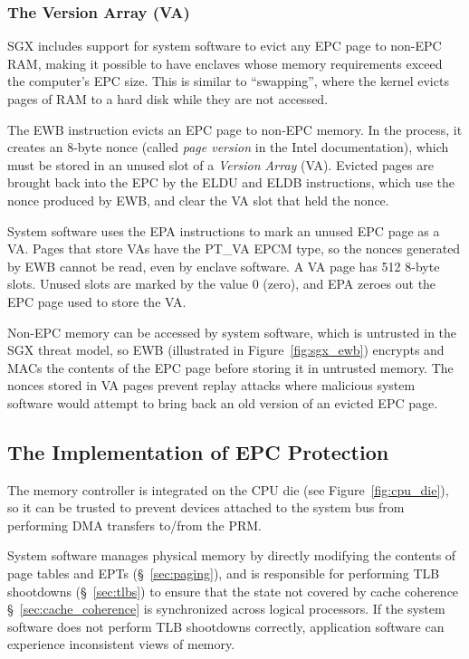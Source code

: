 \subsubsection{The Version Array (VA)}
\label{sec:va}

SGX includes support for system software to evict any EPC page to non-EPC RAM,
making it possible to have enclaves whose memory requirements exceed the
computer's EPC size. This is similar to ``swapping'', where the kernel evicts
pages of RAM to a hard disk while they are not accessed.


The EWB instruction evicts an EPC page to non-EPC memory. In the process, it
creates an 8-byte nonce (called \textit{page version} in the Intel
documentation), which must be stored in an unused slot of a \textit{Version
Array} (VA). Evicted pages are brought back into the EPC by the ELDU and ELDB
instructions, which use the nonce produced by EWB, and clear the VA slot that
held the nonce.

System software uses the EPA instructions to mark an unused EPC page as a VA.
Pages that store VAs have the PT\_VA EPCM type, so the nonces generated by EWB
cannot be read, even by enclave software.  A VA page has 512 8-byte slots.
Unused slots are marked by the value 0 (zero), and EPA zeroes out the EPC page
used to store the VA.

Non-EPC memory can be accessed by system software, which is untrusted in the
SGX threat model, so EWB (illustrated in Figure~\ref{fig:sgx_ewb}) encrypts and
MACs the contents of the EPC page before storing it in untrusted memory. The
nonces stored in VA pages prevent replay attacks where malicious system
software would attempt to bring back an old version of an evicted EPC page.


\subsection {The Implementation of EPC Protection}

The memory controller is
integrated on the CPU die (see Figure~\ref{fig:cpu_die}), so it can be trusted
to prevent devices attached to the system bus from performing DMA transfers
to/from the PRM.

System software manages physical memory by directly modifying the contents of
page tables and EPTs (\S~\ref{sec:paging}), and is responsible for performing
TLB shootdowns (\S~\ref{sec:tlbs}) to ensure that the state not covered by
cache coherence \S~\ref{sec:cache_coherence} is synchronized across logical
processors. If the system software does not perform TLB shootdowns correctly,
application software can experience inconsistent views of memory.

